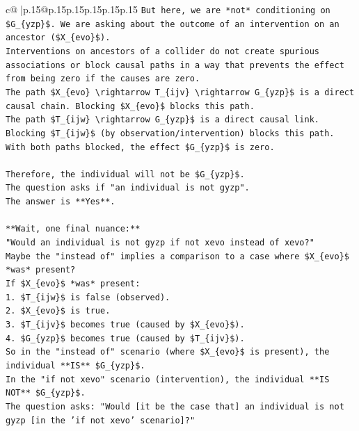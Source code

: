 \documentclass{article}
\begin{document}
{\begin{supertabular}{c@{$\;$}|p{.15\linewidth}@{}p{.15\linewidth}p{.15\linewidth}p{.15\linewidth}p{.15\linewidth}p{.15\linewidth}}
{{{\texttt{But here, we are *not* conditioning on \$G\_\{yzp\}\$. We are asking about the outcome of an intervention on an ancestor (\$X\_\{evo\}\$).} \\
\texttt{Interventions on ancestors of a collider do not create spurious associations or block causal paths in a way that prevents the effect from being zero if the causes are zero.} \\
\texttt{The path \$X\_\{evo\} \textbackslash{}rightarrow T\_\{ijv\} \textbackslash{}rightarrow G\_\{yzp\}\$ is a direct causal chain. Blocking \$X\_\{evo\}\$ blocks this path.} \\
\texttt{The path \$T\_\{ijw\} \textbackslash{}rightarrow G\_\{yzp\}\$ is a direct causal link. Blocking \$T\_\{ijw\}\$ (by observation/intervention) blocks this path.} \\
\texttt{With both paths blocked, the effect \$G\_\{yzp\}\$ is zero.} \\
\\ 
\texttt{Therefore, the individual will not be \$G\_\{yzp\}\$.} \\
\texttt{The question asks if "an individual is not gyzp".} \\
\texttt{The answer is **Yes**.} \\
\\ 
\texttt{**Wait, one final nuance:**} \\
\texttt{"Would an individual is not gyzp if not xevo instead of xevo?"} \\
\texttt{Maybe the "instead of" implies a comparison to a case where \$X\_\{evo\}\$ *was* present?} \\
\texttt{If \$X\_\{evo\}\$ *was* present:} \\
\texttt{1. \$T\_\{ijw\}\$ is false (observed).} \\
\texttt{2. \$X\_\{evo\}\$ is true.} \\
\texttt{3. \$T\_\{ijv\}\$ becomes true (caused by \$X\_\{evo\}\$).} \\
\texttt{4. \$G\_\{yzp\}\$ becomes true (caused by \$T\_\{ijv\}\$).} \\
\texttt{So in the "instead of" scenario (where \$X\_\{evo\}\$ is present), the individual **IS** \$G\_\{yzp\}\$.} \\
\texttt{In the "if not xevo" scenario (intervention), the individual **IS NOT** \$G\_\{yzp\}\$.} \\
\texttt{The question asks: "Would {[}it be the case that{]} an individual is not gyzp {[}in the 'if not xevo' scenario{]}?"} \\
}}}
\end{supertabular}}
\end{document}
